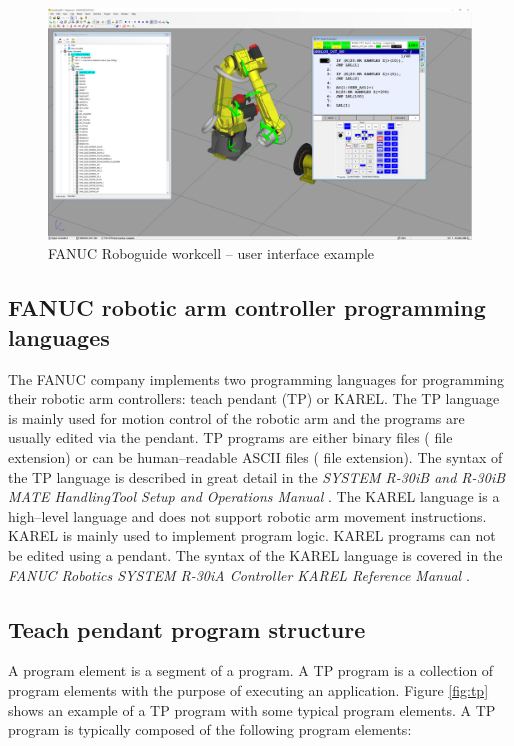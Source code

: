\begin{figure}[h]
    \centering
    \includegraphics[width=0.9\linewidth]{img/roboguide.PNG}
    \caption{FANUC Roboguide workcell -- user interface example}
    \label{fig:roboguide}
\end{figure}

\subsection{FANUC robotic arm controller programming languages}

The FANUC company implements two programming languages for programming their robotic arm controllers: teach pendant (TP) or KAREL. The TP language is mainly used for motion control of the robotic arm and the programs are usually edited via the pendant. TP programs are either binary files ( file extension) or can be human--readable ASCII files ( file extension). The syntax of the TP language is described in great detail in the \emph{SYSTEM R-30iB and R-30iB MATE HandlingTool Setup and Operations Manual} \cite{fanuchandling}. The KAREL language is a high--level language and does not support robotic arm movement instructions. KAREL is mainly used to implement program logic. KAREL programs can not be edited using a pendant. The syntax of the KAREL language is covered in the \emph{FANUC Robotics SYSTEM R-30iA Controller KAREL Reference Manual} \cite{karelmanual}.



\subsection{Teach pendant program structure}

A program element is a segment of a program. A TP program is a collection of program elements with the purpose of executing an application.  Figure \ref{fig:tp} shows an example of a TP program with some typical program elements. A TP program is typically composed of the following program elements:

